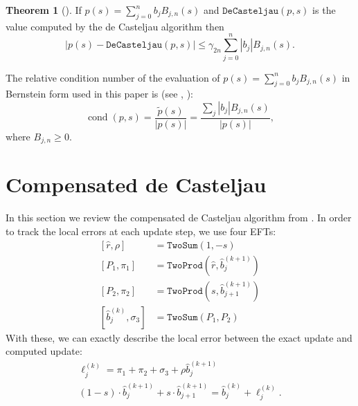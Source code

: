 \documentclass[letterpaper,10pt]{article}
\theoremstyle{definition}
\newtheorem{theorem}{Theorem}
\newcommand{\cond}[1]{\operatorname{cond}\left(#1\right)}
\begin{document}
\begin{theorem}[\cite{Mainar1999}]
If \(p(s) = \sum_{j = 0}^n b_j B_{j, n}(s)\) and \(\mathtt{DeCasteljau}(p, s)\)
is the value computed by the de Casteljau algorithm then
\begin{equation}
\left|p(s) - \mathtt{DeCasteljau}(p, s)\right| \leq \gamma_{2n}
\sum_{j = 0}^n \left|b_j\right| B_{j, n}(s).
\end{equation}
\end{theorem}

The relative condition number of the evaluation of \(p(s) = \sum_{j = 0}^n
b_j B_{j, n}(s)\) in Bernstein form used in this paper is (see
\cite{Mainar1999}, \cite{Farouki1987}):
\begin{equation}
\cond{p, s} = \frac{\widetilde{p}\left(s\right)}{
  \left|p(s)\right|} = \frac{\sum_j \left|b_j\right| B_{j, n}(s)}{
  \left|p(s)\right|},
\end{equation}
where \(B_{j, n} \geq 0\).

\section{Compensated de Casteljau}\label{compensated-2}

In this section we review the compensated de Casteljau algorithm
from \cite{Jiang2010}. In order to track the local errors at
each update step, we use four EFTs:
\begin{align}
\left[\widehat{r}, \rho\right] &= \mathtt{TwoSum}(1, -s) \\
\left[P_1, \pi_1\right] &= \mathtt{TwoProd}\left(\widehat{r}, \widehat{b}_j^{(k + 1)}\right) \\
\left[P_2, \pi_2\right] &= \mathtt{TwoProd}\left(s, \widehat{b}_{j + 1}^{(k + 1)}\right) \\
\left[\widehat{b}_j^{(k)}, \sigma_3\right] &= \mathtt{TwoSum}(P_1, P_2)
\end{align}
With these, we can exactly describe the local error between the exact
update and computed update:
\begin{gather}
\ell_j^{(k)} = \pi_1 + \pi_2 + \sigma_3 + \rho\widehat{b}_j^{(k + 1)} \\
(1 - s) \cdot \widehat{b}_j^{(k + 1)} +
  s \cdot \widehat{b}_{j + 1}^{(k + 1)} =
\widehat{b}_j^{(k)} + \ell_j^{(k)}.
\end{gather}
\end{document}
